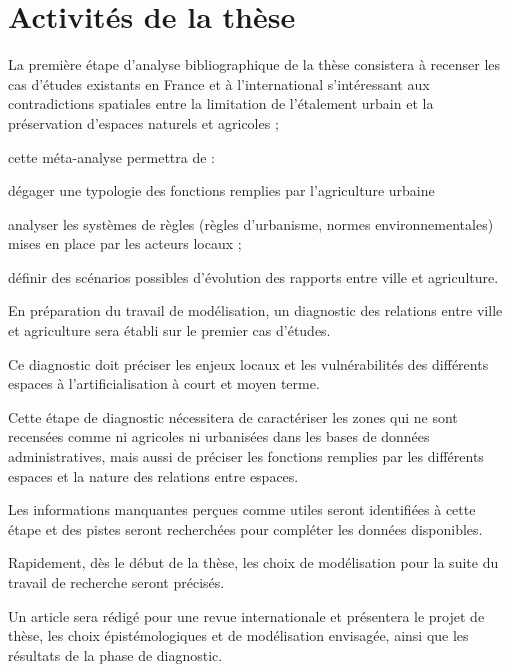 \section[planning]{Activités de la thèse}

\subject{1ère année}

\startitemize[n]

\item	La première étape d'analyse bibliographique de la thèse
	consistera à recenser les cas d'études existants en France et à l'international
	s'intéressant aux contradictions spatiales entre la limitation de l'étalement urbain
	et la préservation d'espaces naturels et agricoles ;

	cette méta-analyse permettra de :

	\startitemize[a,packed]

	\item dégager une typologie des fonctions remplies par l'agriculture urbaine
	\item analyser les systèmes de règles (règles d'urbanisme,
		normes environnementales) mises en place par les acteurs locaux ;
		\item définir des scénarios possibles d'évolution
	  des rapports entre ville et agriculture.

	\stopitemize

\item	En préparation du travail de modélisation,
	un diagnostic des relations entre ville et agriculture
	sera établi sur le premier cas d'études.

	Ce diagnostic doit préciser les enjeux locaux
	et les vulnérabilités des différents espaces
	à l'artificialisation à court et moyen terme.

	Cette étape de diagnostic nécessitera de caractériser les zones
	qui ne sont recensées comme ni agricoles ni urbanisées
	dans les bases de données administratives,
	mais aussi de préciser les fonctions remplies par les différents espaces
	et la nature des relations entre espaces.

	Les informations manquantes perçues comme utiles
	seront identifiées à cette étape et des pistes seront recherchées
	pour compléter les données disponibles.

\item Rapidement, dès le début de la thèse,
	les choix de modélisation pour la suite du travail de recherche
	seront précisés.

\item Un article sera rédigé pour une revue internationale
   et présentera le projet de thèse,
   les choix épistémologiques et de modélisation envisagée,
   ainsi que les résultats de la phase de diagnostic.

